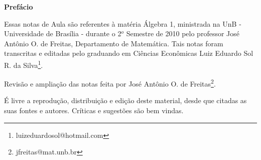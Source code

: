 \begin{center}
\Huge \textbf{Prefácio}
\end{center}

Essas notas de Aula são referentes à matéria Álgebra 1,
ministrada na UnB - Universidade de Brasília - durante o 2$^o$ Semestre de 2010
pelo professor José Antônio O. de Freitas, Departamento de Matemática. Tais
notas foram transcritas e editadas pelo graduando em Ciências Econômicas
Luiz Eduardo Sol R. da Silva\footnote{luizeduardosol@hotmail.com}.

Revisão e ampliação das notas feita por José Antônio O. de Freitas\footnote{jfreitas@mat.unb.br}.


É livre a reprodução, distribuição e edição deste material, desde que citadas as suas fontes e autores. Críticas e sugestões são bem vindas.
\vspace{20cm}






